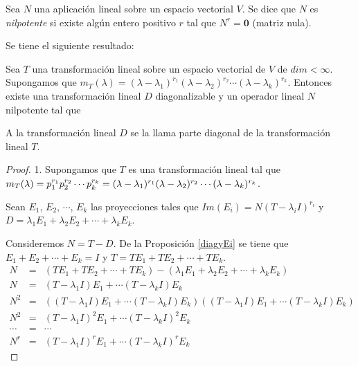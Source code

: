 \bigskip

\begin{definition}\label{nilpo}

Sea $N$ una aplicación lineal sobre un espacio vectorial $V$. Se dice que $N$ es \textit{nilpotente}  si existe algún entero positivo $r$ tal que $N^r= \textbf{0}$  (matriz nula).

\end{definition}


\bigskip

Se tiene el siguiente resultado:

\bigskip

\begin{corollary}
    


Sea $T$ una transformación lineal sobre un espacio vectorial de $V$ de $dim<\infty$. Supongamos que $m_T(\lambda)=(\lambda-\lambda_1)^{r_1} (\lambda-\lambda_2)^{r_2}\cdots(\lambda-\lambda_k)^{r_k}$. Entonces existe una transformación lineal  $D$ diagonalizable y  un operador lineal  $N$ nilpotente tal que 


\bigskip
A la transformación lineal $D$ se la llama parte diagonal de la transformación lineal $T$.
\begin{proof}
1. Supongamos que $T$  es una transformación lineal tal que  $m_T(\lambda)=p_1^{r_1}p_2^{r_2}   \cdots p_k^{r_k}= \\(\lambda-\lambda_1)^{r_1} (\lambda-\lambda_2)^{r_2}\cdots(\lambda-\lambda_k)^{r_k}$. 

Sean $E_1$, $E_2$, $\cdots$, $E_k$ las proyecciones tales que $Im(E_i)=N(T- \lambda_i I)^{r_i}$ y 
$D=\lambda_1 E_1 + \lambda_2 E_2  + \cdots +  \lambda_k E_k$.

\bigskip

Consideremos $N=T-D$.
De la Proposición \ref{diagyEi} se tiene que $E_1+E_2+ \cdots+E_k=I$ y $T=TE_1+TE_2+ \cdots + TE_k$.
\begin{eqnarray*}
    N&=&(T E_1+T E_2 +\cdots +T E_k)- (\lambda_1 E_1 + \lambda_2 E_2  + \cdots +  \lambda_k E_k) \\
     N&=&  (T-\lambda_1 I) E_1 + \cdots  (T-\lambda_k I) E_k \\
N^2&=& ((T-\lambda_1 I) E_1 + \cdots  (T-\lambda_k I) E_k )((T-\lambda_1 I) E_1 + \cdots  (T-\lambda_k I) E_k ) \\
N^2&=& (T-\lambda_1 I)^2 E_1 + \cdots  (T-\lambda_k I)^2 E_k \\
\cdots &=& \cdots \\
N^r&=& (T-\lambda_1 I)^r E_1 + \cdots  (T-\lambda_k I)^r E_k 
\end{eqnarray*}


\end{proof}
\end{corollary}
